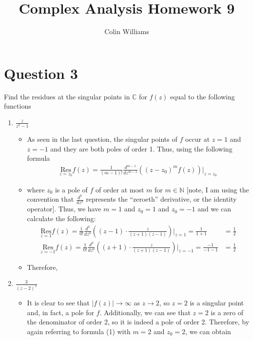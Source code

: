 \documentclass[10pt,a4paper]{article}
\title{Complex Analysis Homework 9}
\author{Colin Williams}
\theoremstyle{definition}
\begin{document}
\maketitle

\section*{Question 3}
Find the residues at the singular points in $\mathbb{C}$ for $f(z)$ equal to the following functions
\begin{enumerate}[label = (\alph*)]
\item $\displaystyle \frac{z}{z^2 - 1}$
	\begin{itemize}
	\item As seen in the last question, the singular points of $f$ occur at $z = 1$ and $z = -1$ and they are both poles of order 1. Thus, using the following formula
	\begin{align}
	\underset{z = z_0}{\text{Res}}f(z) = \frac{1}{(m-1)!}\frac{d^{m-1}}{dz^{m-1}}\left((z - z_0)^mf(z)\right)\bigg|_{z = z_0}
	\end{align}
	\item where $z_0$ is a pole of $f$ of order at most $m$ for $m \in \mathbb{N}$ [note, I am using the convention that $\frac{d^0}{dz^0}$ represents the \enquote{zeroeth} derivative, or the identity operator]. Thus, we have $m = 1$ and $z_0 = 1$ and $z_0 = -1$ and we can calculate the following:
	\begin{align*}
	\underset{z = 1}{\text{Res}}f(z) = \frac{1}{0!}\frac{d^0}{dz^0}\left((z - 1)\cdot \frac{z}{(z + 1)(z - 1)}\right)\bigg|_{z = 1} = \frac{1}{1 + 1} &= \frac{1}{2}\\
		\underset{z = -1}{\text{Res}}f(z) = \frac{1}{0!}\frac{d^0}{dz^0}\left((z + 1)\cdot \frac{z}{(z + 1)(z - 1)}\right)\bigg|_{z = -1} = \frac{-1}{-1 - 1} &= \frac{1}{2}
	\end{align*}
	\item Therefore, 
	\end{itemize}
\item $\displaystyle \frac{3}{(z - 2)^2}$
	\begin{itemize}
	\item It is clear to see that $|f(z)| \to \infty$ as $z \to 2$, so $z = 2$ is a singular point and, in fact, a pole for $f$. Additionally, we can see that $z = 2$ is a zero of the denominator of order 2, so it is indeed a pole of order 2. Therefore, by again referring to formula (1) with $m = 2$ and $z_0 = 2$, we can obtain

\end{itemize}
\end{enumerate}
\end{document}
